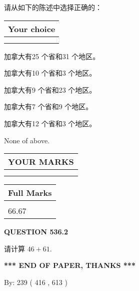 \documentclass{ctexart}
\begin{document}
  
请从如下的陈述中选择正确的：
  
  
\noindent\hspace{3.0in} \begin{tabular}{|l|}
\hline
Your choice \\
\hline
 \\ 
 \\ 
\hline
\end{tabular}
  
  
 
 
加拿大有25 个省和31 个地区。
 
 
加拿大有10 个省和3 个地区。
 
 
加拿大有9 个省和23 个地区。
 
 
加拿大有7 个省和9 个地区。
 
 
加拿大有12 个省和3 个地区。
 
 
 None of above.
 
 
  
\vspace{0.2in}
  
\noindent\begin{tabular}{|l|}
\hline
 YOUR MARKS  \\
\hline
 \\ 
 \\ 
\hline
\end{tabular}
\hspace{0.05in} \begin{tabular}{|l|}
\hline
 Full Marks  \\
\hline
 \\ 
66.67 \\
\hline
\end{tabular}
{\textbf{\Large{QUESTION
536.2 
}}}
  
  
 
请计算 $ %
46 +  %
61 $.
 

 

 
   
   
 \vspace{0.2in}
 
   
   
   
   
\vspace{1.0in} 
{\textbf{\large{ *** END OF PAPER, THANKS *** }}} 
   
   
\hspace{1.0in} By: 
 239 ( 416 ,  613 )
   
\end{document}
